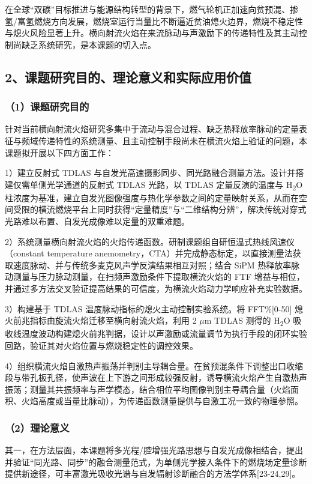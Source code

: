 \documentclass[UTF8,a4paper,zihao=-4,fontset=windows]{ctexart}
\begin{document}
在全球“双碳”目标推进与能源结构转型的背景下，燃气轮机正加速向贫预混、掺氢/富氢燃烧方向发展，燃烧室运行当量比不断逼近贫油熄火边界，燃烧不稳定性与熄火风险显著上升。横向射流火焰在来流脉动与声激励下的传递特性及其主动控制尚缺乏系统研究，是本课题的切入点。

\subsection{2、课题研究目的、理论意义和实际应用价值}
\subsubsection{（1）课题研究目的}
针对当前横向射流火焰研究多集中于流动与混合过程、缺乏热释放率脉动的定量表征与频域传递特性的系统测量、且主动控制手段尚未在横流火焰上验证的问题，本课题拟开展以下四方面工作：

1）建立反射式 TDLAS 与自发光高速摄影同步、同光路融合测量方法。设计并搭建仅需单侧光学通道的反射式 TDLAS 光路，以 TDLAS 定量反演的温度与 H\textsubscript{2}O 柱浓度为基准，建立自发光图像强度与热化学参数之间的定量映射关系，从而在空间受限的横流燃烧平台上同时获得“定量精度”与“二维结构分辨”，解决传统对穿式光路难以布置、自发光成像难以定量的双重难题。

2）系统测量横向射流火焰的火焰传递函数。研制课题组自研恒温式热线风速仪（constant temperature anemometry，CTA）并完成静态标定，以直接测量法获取速度脉动、并与传统多麦克风声学反演结果相互对照；结合 SiPM 热释放率脉动测量与压力脉动测量，在扫频声激励条件下提取横流火焰的 FTF 增益与相位，并通过多方法交叉验证提高结果的可信度，为横流火焰动力学响应补充实验数据。

3）构建基于 TDLAS 温度脉动指标的熄火主动控制实验系统。将 FFT\%[0-50] 熄火前兆指标由旋流火焰迁移至横向射流火焰，利用 2 $\mu$m TDLAS 测得的 H\textsubscript{2}O 吸收线温度波动构建熄火前兆判据，设计以声激励或流量调节为执行手段的闭环实验回路，验证其对火焰位置与燃烧稳定性的调控效果。

4）组织横流火焰自激热声振荡并判别主导耦合量。在贫预混条件下调整出口收缩段与带孔板孔径，使声波在上下游之间形成较强反射，诱导横流火焰产生自激热声振荡；测量其共振频率与声学模态，结合相位平均图像判别主导耦合量（火焰面积、火焰高度或当量比脉动），为传递函数测量提供与自激工况一致的物理参照。

\subsubsection{（2）理论意义}
其一，在方法层面，本课题将多光程/腔增强光路思想与自发光成像相结合，提出并验证“同光路、同步”的融合测量范式，为单侧光学接入条件下的燃烧场定量诊断提供新途径，可丰富激光吸收光谱与自发辐射诊断融合的方法学体系[23-24,29]。
\end{document}
